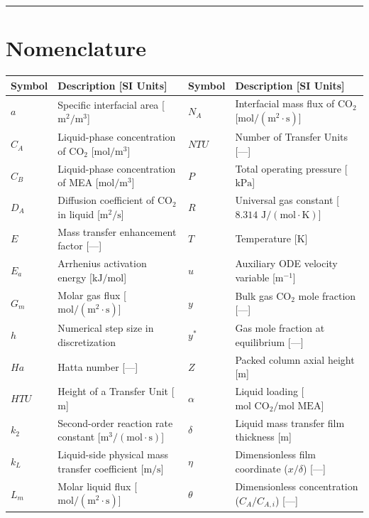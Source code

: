 \documentclass[11pt,a4paper]{article}
\begin{document}
\vspace{1em}
\hrule
\vspace{1em}

\section*{Nomenclature}
\begin{tabularx}{\textwidth}{l l l l}
\toprule
\textbf{Symbol} & \textbf{Description [SI Units]} & \textbf{Symbol} & \textbf{Description [SI Units]} \\
\midrule
$a$ & Specific interfacial area [$\text{m}^2/\text{m}^3$] & $N_A$ & Interfacial mass flux of $\text{CO}_2$ [$\text{mol}/(\text{m}^2\cdot\text{s})$] \\
$C_A$ & Liquid-phase concentration of $\text{CO}_2$ [$\text{mol}/\text{m}^3$] & $NTU$ & Number of Transfer Units [---] \\
$C_B$ & Liquid-phase concentration of MEA [$\text{mol}/\text{m}^3$] & $P$ & Total operating pressure [$\text{kPa}$] \\
$D_A$ & Diffusion coefficient of $\text{CO}_2$ in liquid [$\text{m}^2/\text{s}$] & $R$ & Universal gas constant [$8.314\text{ J}/(\text{mol}\cdot\text{K})$] \\
$E$ & Mass transfer enhancement factor [---] & $T$ & Temperature [$\text{K}$] \\
$E_a$ & Arrhenius activation energy [$\text{kJ}/\text{mol}$] & $u$ & Auxiliary ODE velocity variable [$\text{m}^{-1}$] \\
$G_m$ & Molar gas flux [$\text{mol}/(\text{m}^2\cdot\text{s})$] & $y$ & Bulk gas $\text{CO}_2$ mole fraction [---] \\
$h$ & Numerical step size in discretization & $y^*$ & Gas mole fraction at equilibrium [---] \\
$Ha$ & Hatta number [---] & $Z$ & Packed column axial height [$\text{m}$] \\
$HTU$ & Height of a Transfer Unit [$\text{m}$] & $\alpha$ & Liquid loading [$\text{mol CO}_2/\text{mol MEA}$] \\
$k_2$ & Second-order reaction rate constant [$\text{m}^3/(\text{mol}\cdot\text{s})$] & $\delta$ & Liquid mass transfer film thickness [$\text{m}$] \\
$k_L$ & Liquid-side physical mass transfer coefficient [$\text{m}/\text{s}$] & $\eta$ & Dimensionless film coordinate ($x/\delta$) [---] \\
$L_m$ & Molar liquid flux [$\text{mol}/(\text{m}^2\cdot\text{s})$] & $\theta$ & Dimensionless concentration ($C_A/C_{A,i}$) [---] \\
\bottomrule
\end{tabularx}
\end{document}
